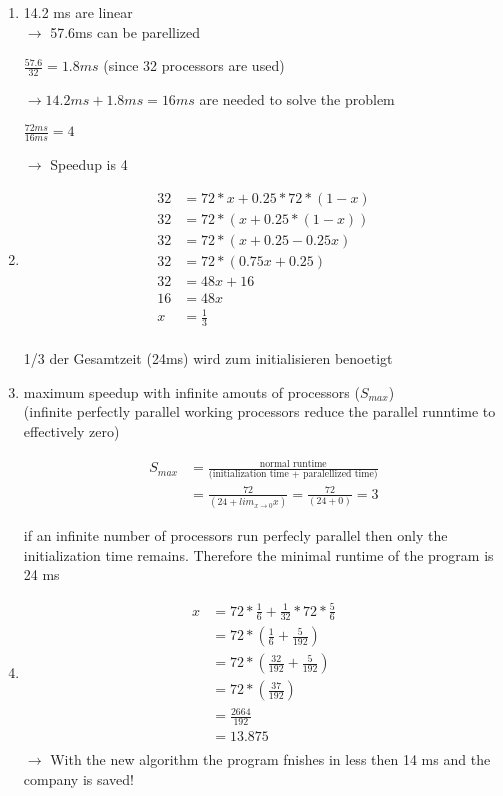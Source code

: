 \documentclass{article}
\begin{document}
\begin{enumerate}[label=(\alph*)]

\item 14.2 ms are linear\\
$\rightarrow$ 57.6ms can be parellized

$\frac{57.6}{32} = 1.8 ms$ (since 32 processors are used)

$\rightarrow 14.2 ms + 1.8 ms = 16 ms$ are needed to solve the problem

$\frac{72ms}{16ms} = 4$

$\rightarrow$ Speedup is 4

\item 
\begin{align*}
	32 &= 72 * x + 0.25 * 72 * (1-x) \\
	32 &= 72 * (x + 0.25 * (1-x)) \\
	32 &= 72 * (x + 0.25 - 0.25x) \\
	32 &= 72 * (0.75x + 0.25) \\
	32 &= 48x + 16 \\
	16 &= 48x \\
	x &= \frac{1}{3} \\
\end{align*}

1/3 der Gesamtzeit (24ms) wird zum initialisieren benoetigt

\item 
maximum speedup with infinite amouts of processors ($S_{max}$) \\
(infinite perfectly parallel working processors reduce the parallel runntime to effectively zero)

\begin{align*}
	S_{max} &= \frac{\text{normal runtime}}{\text{(initialization time + paralellized time)}} \\
	&= \frac{72}{(24 + lim_{x\rightarrow 0} x)} = \frac{72}{(24 + 0)} = 3
\end{align*}

if an infinite number of processors run perfecly parallel then only the initialization time
remains. Therefore the minimal runtime of the program is 24 ms

\item 
\begin{align*}
	x &= 72 * \frac{1}{6} + \frac{1}{32} * 72 * \frac{5}{6} \\
	&= 72 * (\frac{1}{6} + \frac{5}{192}) \\
	&= 72 * (\frac{32}{192} + \frac{5}{192}) \\
	&= 72 * (\frac{37}{192}) \\
	&= \frac{2664}{192} \\
	&=13.875 \\
\end{align*}
$\rightarrow$ With the new algorithm the program fnishes in less then 14 ms and the company is saved!

\end{enumerate}
\end{document}
